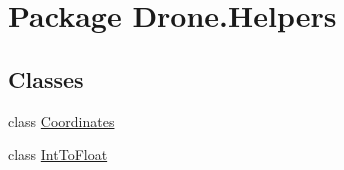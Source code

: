 \hypertarget{namespace_drone_1_1_helpers}{}\section{Package Drone.\+Helpers}
\label{namespace_drone_1_1_helpers}
\subsection*{Classes}
\begin{DoxyCompactItemize}
\item 
class \hyperlink{class_drone_1_1_helpers_1_1_coordinates}{Coordinates}
\item 
class \hyperlink{class_drone_1_1_helpers_1_1_int_to_float}{Int\+To\+Float}
\end{DoxyCompactItemize}
